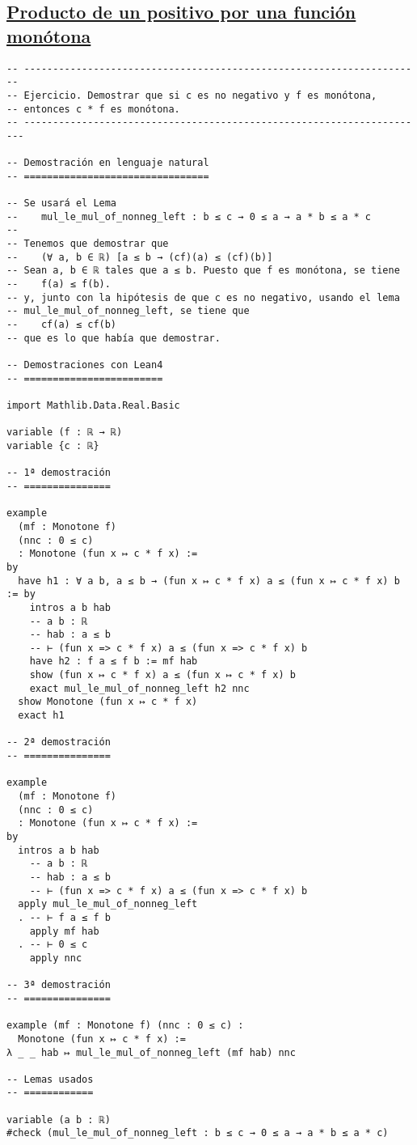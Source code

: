 \subsection{\href{./src/Logica/Producto\_de\_un\_positivo\_por\_una\_funcion\_monotona.lean}{Producto de un positivo por una función monótona}}
\label{sec:orge59fd48}
\begin{verbatim}
-- ---------------------------------------------------------------------
-- Ejercicio. Demostrar que si c es no negativo y f es monótona,
-- entonces c * f es monótona.
-- ----------------------------------------------------------------------

-- Demostración en lenguaje natural
-- ================================

-- Se usará el Lema
--    mul_le_mul_of_nonneg_left : b ≤ c → 0 ≤ a → a * b ≤ a * c
--
-- Tenemos que demostrar que
--    (∀ a, b ∈ ℝ) [a ≤ b → (cf)(a) ≤ (cf)(b)]
-- Sean a, b ∈ ℝ tales que a ≤ b. Puesto que f es monótona, se tiene
--    f(a) ≤ f(b).
-- y, junto con la hipótesis de que c es no negativo, usando el lema
-- mul_le_mul_of_nonneg_left, se tiene que
--    cf(a) ≤ cf(b)
-- que es lo que había que demostrar.

-- Demostraciones con Lean4
-- ========================

import Mathlib.Data.Real.Basic

variable (f : ℝ → ℝ)
variable {c : ℝ}

-- 1ª demostración
-- ===============

example
  (mf : Monotone f)
  (nnc : 0 ≤ c)
  : Monotone (fun x ↦ c * f x) :=
by
  have h1 : ∀ a b, a ≤ b → (fun x ↦ c * f x) a ≤ (fun x ↦ c * f x) b := by
    intros a b hab
    -- a b : ℝ
    -- hab : a ≤ b
    -- ⊢ (fun x => c * f x) a ≤ (fun x => c * f x) b
    have h2 : f a ≤ f b := mf hab
    show (fun x ↦ c * f x) a ≤ (fun x ↦ c * f x) b
    exact mul_le_mul_of_nonneg_left h2 nnc
  show Monotone (fun x ↦ c * f x)
  exact h1

-- 2ª demostración
-- ===============

example
  (mf : Monotone f)
  (nnc : 0 ≤ c)
  : Monotone (fun x ↦ c * f x) :=
by
  intros a b hab
    -- a b : ℝ
    -- hab : a ≤ b
    -- ⊢ (fun x => c * f x) a ≤ (fun x => c * f x) b
  apply mul_le_mul_of_nonneg_left
  . -- ⊢ f a ≤ f b
    apply mf hab
  . -- ⊢ 0 ≤ c
    apply nnc

-- 3ª demostración
-- ===============

example (mf : Monotone f) (nnc : 0 ≤ c) :
  Monotone (fun x ↦ c * f x) :=
λ _ _ hab ↦ mul_le_mul_of_nonneg_left (mf hab) nnc

-- Lemas usados
-- ============

variable (a b : ℝ)
#check (mul_le_mul_of_nonneg_left : b ≤ c → 0 ≤ a → a * b ≤ a * c)
\end{verbatim}

